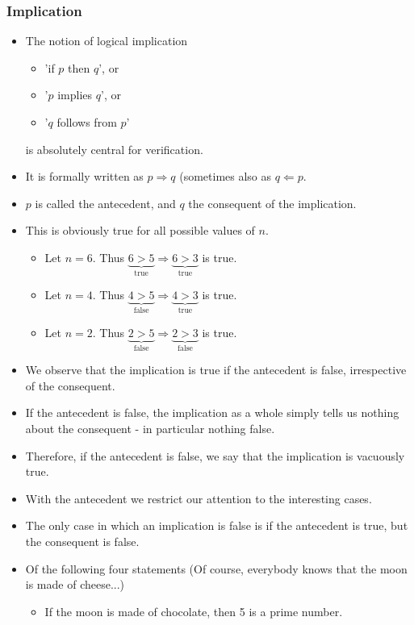 \begin{multicols}{2}
\subsubsection{Implication}
\begin{itemize}
  \item The notion of logical implication
  \begin{itemize}
    \item 'if $p$ then $q$', or
    \item '$p$ implies $q$', or
    \item '$q$ follows from $p$'
  \end{itemize}
  is absolutely central for verification.
  \item It is formally written as $p \Rightarrow q$ (sometimes also as $q \Leftarrow p$.
  \item $p$ is called the antecedent, and $q$ the consequent of the implication.
  \item This is obviously true for all possible values of $n$.
  \begin{itemize}
    \item Let $n=6$. Thus $\underbrace{6>5}_\text{true} \Rightarrow \underbrace{6>3}_\text{true}$ is true.
    \item Let $n=4$. Thus $\underbrace{4>5}_\text{false} \Rightarrow \underbrace{4>3}_\text{true}$ is true.
    \item Let $n=2$. Thus $\underbrace{2>5}_\text{false} \Rightarrow \underbrace{2>3}_\text{false}$ is true.
  \end{itemize}
  \item We observe that the implication is true if the antecedent is false, irrespective of the consequent.
  \item If the antecedent is false, the implication as a whole simply tells us nothing about the consequent - in particular nothing false.
  \item Therefore, if the antecedent is false, we say that the implication is vacuously true.
  \item With the antecedent we restrict our attention to the interesting cases.
  \item The only case in which an implication is false is if the antecedent is true, but the consequent is false.
  \item Of the following four statements (Of course, everybody knows that the moon is made of cheese...)
  \begin{itemize}
    \item If the moon is made of chocolate, then 5 is a prime number.

\end{itemize}
\end{itemize}
\end{multicols}
